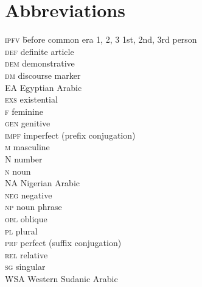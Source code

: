 \documentclass[output=paper]{langsci/langscibook}
\begin{document}
\section*{Abbreviations}
\setlength{\columnsep}{30pt}
\begin{multicols}{2}
\begin{tabbing}
\textsc{ipfv} \hspace{1em} \= before common era\kill
\textsc{1, 2, 3} \> 1st, 2nd, 3rd person \\
\textsc{def} \> {definite} {article} \\
\textsc{dem} \> demonstrative \\
\textsc{dm} \> discourse marker \\
{EA} \> {Egyptian} {Arabic} \\
\textsc{exs} \> {existential}  \\
\textsc{f} \> feminine \\
\textsc{gen} \> genitive \\
\textsc{impf} \> imperfect (prefix conjugation) \\
\textsc{m} \> masculine \\
N \> number \\
\textsc{n} \> noun \\
{NA} \> {{Nigerian} Arabic} \\
\textsc{neg} \> negative \\
\textsc{np} \> {noun phrase} \\
\textsc{obl} \> oblique \\
\textsc{pl} \> plural \\
\textsc{prf} \> perfect (suffix conjugation) \\
\textsc{rel} \> {relative} \\
\textsc{sg} \> singular \\
{WSA} \> Western {Sudanic} {Arabic}
\end{tabbing}
\end{multicols}


{\sloppy\printbibliography[heading=subbibliography,notkeyword=this]}
\end{document}
